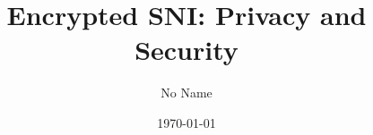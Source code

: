 \documentclass[twoside]{article}
\title{Encrypted SNI: Privacy and Security}
\author{No Name}
\date{\today}
\theoremstyle{definition}
\begin{document}
\maketitle

\begin{comment}
# Outline
- ESNI use cases, overview, and desired security goals:
    - Use cases:
        - Name privacy (coupled with DNS) against "active" attacker (modulo traffic analysis), local service discovery
    - Operational requirements and criteria: (listed from the draft)
    - Design overview:
        - Summary of draft 4
        - Overview of related designs
    - Four security/privacy requirements:
        - ESNI privacy (requirement #2):
            1. Both endpoints agree on the context
            2. Agreement implies knowledge of SNI and key share
            3. Client has proof that server has private ESNI key
    - Passive attacker: 
        - Probabilistic public key encryption (is sufficient?)
    - Known active attacks and observations:
        - Probing (client offline, draft 4): Differences in service configurations can leak information.
        - HRR mix and match (client offline, draft 4): Attacker-chosen key share, client-chosen SNI.
        - Server reaction attack (client offline, draft 4): Use ticket and server reaction for dictionary attack.
        - Client reaction attacks (earlier draft, client online): Include nonce so that same entity which sent certificate actually processed the ESNI value.
        <!-- - HRR trial decryption (client offline): Client-chosen SNI, server-chosen key share. -->
        <!-- - PSK and ENSI (draft 4): Change CH ESNI value to be attacker-controlled, and server aborts or not based on SNI+PSK equality -->
- Basic anonymous DH model (handshake secret integrity):
    - (Challenge response with the nonce)
    - Two messages (CH, SH), and proof
    - Four messages (CH1, HRR, CH2, SH), and proof
- Handshake side channels
    - (Data about handshake message size distribution?)
    - (Application data side channels -- defer to future work?)
    - CH and SH generation functions and requirements
- Integration with TLS
    - Proxy-based transformation
    - PSK binder and key schedule injection
    - (Signalling via SH.Random or explicit SH extension)
- Implementation and experimentation
\end{comment}
\end{document}
